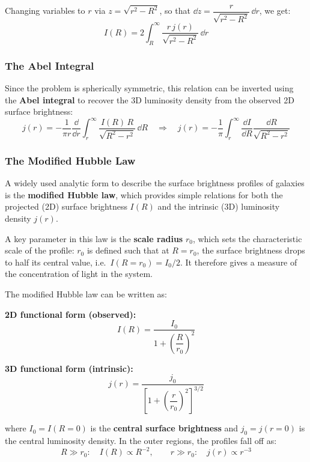 \noindent Changing variables to $r$ via $z = \sqrt{r^2 - R^2}$, so that $\dd{z} = \dfrac{r}{\sqrt{r^2 - R^2}}\,\dd{r}$, we get:
$$
I(R) = 2\int_R^\infty \frac{r\,j(r)}{\sqrt{r^2 - R^2}}\,\dd{r}
$$

\subsubsection{The Abel Integral}

Since the problem is spherically symmetric, this relation can be inverted using the \textbf{Abel integral} to recover the 3D luminosity density from the observed 2D surface brightness:
$$
j(r) = -\frac{1}{\pi r}\frac{\dd}{\dd r}\int_r^\infty \frac{I(R)\,R}{\sqrt{R^2-r^2}}\,\dd{R}
\quad\Longrightarrow\quad
j(r) = -\frac{1}{\pi}\int_r^\infty \frac{\dd I}{\dd R}\frac{\dd{R}}{\sqrt{R^2-r^2}}
$$

\subsubsection{The Modified Hubble Law}

A widely used analytic form to describe the surface brightness profiles of galaxies is the \textbf{modified Hubble law}, which provides simple relations for both the projected (2D) surface brightness $I(R)$ and the intrinsic (3D) luminosity density $j(r)$. 

A key parameter in this law is the \textbf{scale radius} $r_0$, which sets the characteristic scale of the profile: $r_0$ is defined such that at $R=r_0$, the surface brightness drops to half its central value, i.e.\ $I(R=r_0) = I_0/2$. It therefore gives a measure of the concentration of light in the system.

The modified Hubble law can be written as:

\vspace{0.5em}

\begin{minipage}{0.48\textwidth}
    \textbf{2D functional form (observed):}
    $$
    I(R) = \frac{I_0}{1 + \left(\dfrac{R}{r_0}\right)^2}
    $$
\end{minipage}%
\hfill
\begin{minipage}{0.48\textwidth}
    \textbf{3D functional form (intrinsic):}
    $$
    j(r) = \frac{j_0}{\left[1+\left(\dfrac{r}{r_0}\right)^2\right]^{3/2}}
    $$
\end{minipage}

\noindent where $I_0 = I(R=0)$ is the \textbf{central surface brightness} and $j_0 = j(r=0)$ is the central luminosity density. In the outer regions, the profiles fall off as:
$$
R \gg r_0: \quad I(R) \propto R^{-2}, \qquad r \gg r_0: \quad j(r) \propto r^{-3}
$$

